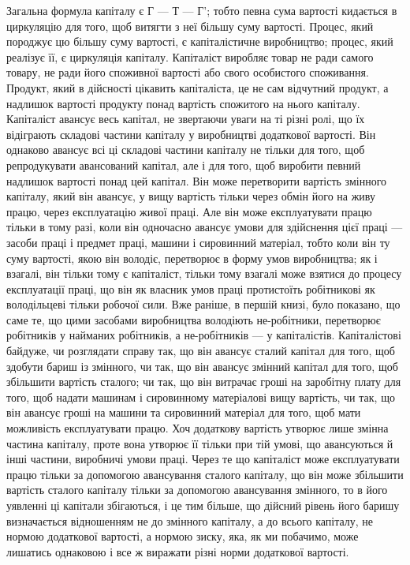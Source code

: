Загальна формула капіталу є Г — Т — Г'; тобто певна сума
вартості кидається в циркуляцію для того, щоб витягти з неї
більшу суму вартості. Процес, який породжує цю більшу суму
вартості, є капіталістичне виробництво; процес, який реалізує
її, є циркуляція капіталу. Капіталіст виробляє товар не ради
самого товару, не ради його споживної вартості або свого особистого
споживання. Продукт, який в дійсності цікавить капіталіста,
це не сам відчутний продукт, а надлишок вартості продукту
понад вартість спожитого на нього капіталу. Капіталіст
авансує весь капітал, не звертаючи уваги на ті різні ролі, що їх
відіграють складові частини капіталу у виробництві додаткової
вартості. Він однаково авансує всі ці складові частини капіталу
не тільки для того, щоб репродукувати авансований капітал, але
і для того, щоб виробити певний надлишок вартості понад
цей капітал. Він може перетворити вартість змінного капіталу,
який він авансує, у вищу вартість тільки через обмін його на
живу працю, через експлуатацію живої праці. Але він може експлуатувати
працю тільки в тому разі, коли він одночасно авансує
умови для здійснення цієї праці — засоби праці і предмет
праці, машини і сировинний матеріал, тобто коли він ту суму
вартості, якою він володіє, перетворює в форму умов виробництва;
як і взагалі, він тільки тому є капіталіст, тільки тому взагалі
може взятися до процесу експлуатації праці, що він як власник
умов праці протистоїть робітникові як володільцеві тільки робочої
сили. Вже раніше, в першій книзі, було показано, що саме
те, що цими засобами виробництва володіють не-робітники, перетворює
робітників у найманих робітників, а не-робітників — у капіталістів.
Капіталістові байдуже, чи розглядати справу так, що він
авансує сталий капітал для того, щоб здобути бариш із змінного,
чи так, що він авансує змінний капітал для того, щоб збільшити
вартість сталого; чи так, що він витрачає гроші на заробітну
плату для того, щоб надати машинам і сировинному матеріалові
вищу вартість, чи так, що він авансує гроші на машини та сировинний
матеріал для того, щоб мати можливість експлуатувати працю.
Хоч додаткову вартість утворює лише змінна частина капіталу,
проте вона утворює її тільки при тій умові, що авансуються
й інші частини, виробничі умови праці. Через те що капіталіст
може експлуатувати працю тільки за допомогою авансування сталого
капіталу, що він може збільшити вартість сталого капіталу
тільки за допомогою авансування змінного, то в його уявленні
ці капітали збігаються, і це тим більше, що дійсний рівень його
баришу визначається відношенням не до змінного капіталу, а
до всього капіталу, не нормою додаткової вартості, а нормою
зиску, яка, як ми побачимо, може лишатись однаковою і все ж
виражати різні норми додаткової вартості.

